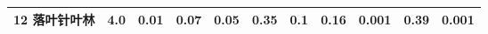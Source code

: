 \begin{sidewaystable}[]
\begin{tabular}{@{}lcccccccccc@{}}
    12 落叶针叶林       & 4.0        & 0.01                                                                         & 0.07                                                                                                            & 0.05                                                                                                            & 0.35                                                                                                            & 0.1                                                                                                             & 0.16                                                                                                            & 0.001                                                                                                           & 0.39                                                                                                            & 0.001                                                                                                           \\\bottomrule
    \end{tabular}
\end{sidewaystable}


